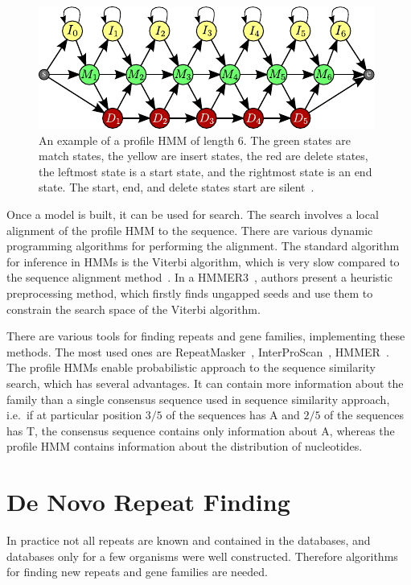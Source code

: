 \begin{figure}[htp]
    \centering
    \includegraphics[width=.7\textwidth]{../figures/profile_hmm}
    \caption[Profile HMM]{An example of a profile HMM of length 6. The green states are match states, the yellow are insert states, the red are delete states, the leftmost state is a start state, and the rightmost state is an end state.
    The start, end, and delete states start are silent~\cite{nanasi2014probabilistic}.}\label{fig:profile-hmm}
\end{figure}

Once a model is built, it can be used for search. The search involves a local alignment of the profile HMM to the sequence.
There are various dynamic programming algorithms for performing the alignment. The standard algorithm for inference in HMMs is the Viterbi algorithm, which is very slow compared to the sequence alignment method~\cite{eddy2011accelerated}. In a HMMER3~\cite{eddy2011accelerated}, authors present a heuristic preprocessing method, which firstly finds ungapped seeds and use them to constrain the search space of the Viterbi algorithm.

There are various tools for finding repeats and gene families, implementing these methods.
The most used ones are RepeatMasker~\cite{repeatmasker}, InterProScan~\cite{mitchell2015interpro}, HMMER~\cite{eddy2011accelerated}.
The profile HMMs enable probabilistic approach to the sequence similarity search, which has several advantages. It can contain more information about the family than a single consensus sequence used in sequence similarity approach, i.e.\ if at particular position $3/5$ of the sequences has A and $2/5$ of the sequences has T, the consensus sequence contains only information about A, whereas the profile HMM contains information about the distribution of nucleotides.

\section{De Novo Repeat Finding}

In practice not all repeats are known and contained in the databases, and databases only for a few organisms were well constructed. Therefore algorithms for finding new repeats and gene families are needed.

